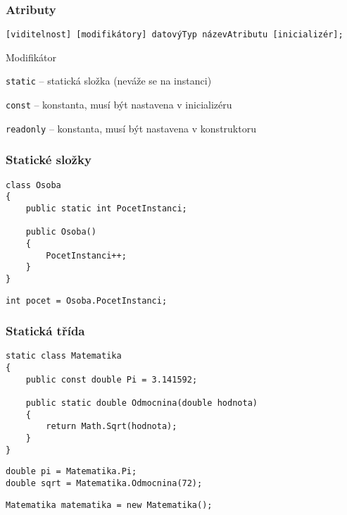 \begin{frame}[fragile]
\frametitle{Atributy}

\begin{noteblock}{}
\begin{lstlisting}
[viditelnost] [modifikátory] datovýTyp názevAtributu [inicializér];
\end{lstlisting}
\end{noteblock}

\begin{bitemize}{Modifikátor}
\item \lstinline|static| -- statická složka (neváže se na instanci)
\item \lstinline|const| -- konstanta, musí být nastavena v inicializéru
\item \lstinline|readonly| -- konstanta, musí být nastavena v konstruktoru
\end{bitemize}
\end{frame}



\begin{frame}[fragile]
\frametitle{Statické složky}
\begin{yesblock}
\begin{lstlisting}
class Osoba
{
    public static int PocetInstanci;

    public Osoba() 
    { 
        PocetInstanci++; 
    }
}
\end{lstlisting}
\end{yesblock}

\begin{yesblock}
\begin{lstlisting}
int pocet = Osoba.PocetInstanci;
\end{lstlisting}
\end{yesblock}
\end{frame}



\begin{frame}[fragile]
\frametitle{Statická třída}
\begin{yesblock}
\begin{lstlisting}
static class Matematika
{
    public const double Pi = 3.141592;

    public static double Odmocnina(double hodnota)
    {
        return Math.Sqrt(hodnota);
    }
}
\end{lstlisting}
\end{yesblock}

\begin{yesblock}
\begin{lstlisting}
double pi = Matematika.Pi;
double sqrt = Matematika.Odmocnina(72);
\end{lstlisting}
\end{yesblock}

\begin{noblock}
\begin{lstlisting}
Matematika matematika = new Matematika();
\end{lstlisting}
\end{noblock}
\end{frame}



